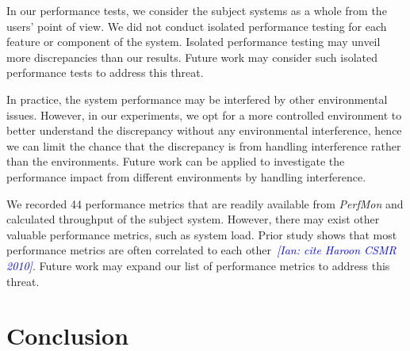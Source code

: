 \documentclass[smallextended]{svjour3}       %
\newcommand{\ian}[1]{\textcolor{blue}{{\it [Ian: #1]}}}
\begin{document}
In our performance tests, we consider the subject systems as a whole from the users' point of view. We did not conduct isolated performance testing for each feature or component of the system. Isolated performance testing may unveil more discrepancies than our results. Future work may consider such isolated performance tests to address this threat.

In practice, the system performance may be interfered by other environmental issues. However, in our experiments, we opt for a more controlled environment to better understand the discrepancy without any environmental interference, hence we can limit the chance that the discrepancy is from handling interference rather than the environments. Future work can be applied to investigate the performance impact from different environments by handling interference.

We recorded 44 performance metrics that are readily available from \emph{PerfMon} and calculated throughput of the subject system. However, there may exist other valuable performance metrics, such as system load. Prior study shows that most performance metrics are often correlated to each other~\cite{harooncsmr}\ian{cite Haroon CSMR 2010}. Future work may expand our list of performance metrics to address this threat.



\section{Conclusion}
\label{sec:conclusion}
\end{document}
